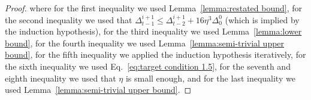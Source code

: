 \begin{proof}
		
where for the first inequality we used Lemma~\ref{lemma:restated bound}, 
for the second inequality we used that $\Delta_{t-1}^{i+1} \le \Delta_{t-2}^{i+1}+16\eta^3\Delta^0_0$ (which is implied by the induction hypothesis), 
for the third inequality we used Lemma~\ref{lemma:lower bound},
for the fourth inequality we used Lemma~\ref{lemma:semi-trivial upper bound},
for the fifth inequality we applied the induction hypothesis iteratively, for the sixth inequality we used Eq.~\eqref{eq:target condition 1.5}, for the seventh and eighth inequality we used that $\eta$ is small enough, and for the last inequality we used Lemma~\ref{lemma:semi-trivial upper bound}.

\end{proof}
